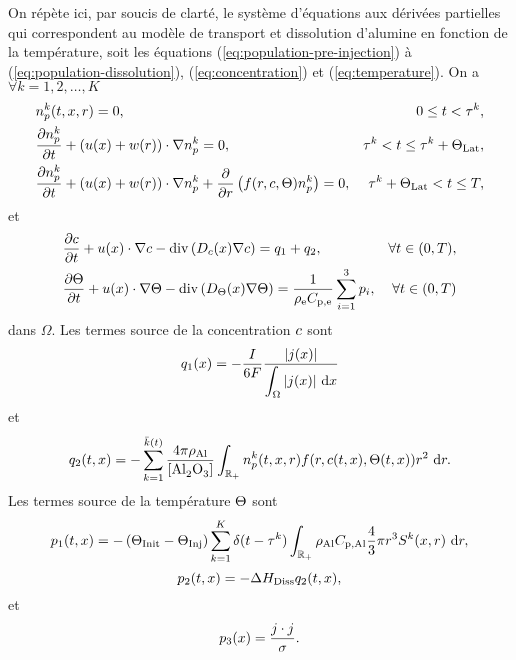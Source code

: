 On répète ici, par soucis de clarté, le système d'équations aux
dérivées partielles qui correspondent au modèle de transport et
dissolution d'alumine en fonction de la température, soit les
équations (\ref{eq:population-pre-injection}) à
(\ref{eq:population-dissolution}), (\ref{eq:concentration}) et
(\ref{eq:temperature}). On a $\forall k = 1, 2, \dots, K$
\begin{align}
  & n_p^k(t, x, r) = 0,
  & 0\leq t < \tau^k,\label{eq:mdl-eq-1}\\
%
  & \frac{\partial n_p^k}{\partial t} + \parent{u(x) + w(r)}\cdot \nabla  n_p^k = 0,
  & \tau^k < t \leq \tau^k + \tlat,\label{eq:mdl-eq-2}\\
%
  & \frac{\partial n_p^k}{\partial t} + \parent{u(x) + w(r)}\cdot \nabla  n_p^k + \frac{\partial }{\partial r}\parent{f(r, \concentration, \temperature)n_p^k} = 0,
  & \tau^k + \tlat < t \leq \tend,\label{eq:mdl-eq-3}
\end{align}
et
\begin{align}
  & \frac{\partial \concentration}{\partial t} + u(x)\cdot\nabla \concentration - \div\parent{\cdiffusivity(x) \nabla \concentration} = q_1 + q_2,
  & \forall t\in (0, T),\label{eq:mdl-eq-4}\\
%
  & \frac{\partial \temperature}{\partial t} + u(x)\cdot\nabla\temperature - \div\parent{\electrolytetdiff(x)\nabla \temperature} = \frac{1}{\electrolytedensity\electrolytehc}\sum_{i = 1}^{3}p_i,
  & \forall t\in(0, T)\label{eq:mdl-eq-5}
\end{align}
dans $\Omega$. Les termes source de la concentration $c$ sont
\begin{equation}
  q_1(x) = -\frac{I}{6\faraday} %
  \frac{\abs{j(x)}}{\displaystyle\int_\Omega\abs{j(x)}\intd{x}}
\end{equation}
et
\begin{equation}
  q_2(t, x) = -\sum_{k = 1}^{\bar
    k(t)}\frac{4\pi\aluminadensity}{[\ce{Al2O3}]}\int_{\rplus}n_p^k(t,
  x, r)f(r, \concentration(t, x), \temperature(t, x))r^2\,\intd{r}.
\end{equation}
Les termes source de la température $\Theta$ sont
\begin{equation}
  p_1(t, x) = -\left( \Theta_\text{Init}-\Theta_\text{Inj} \right)\sum_{k = 1}^{K}\delta(t -
  \tau^k)\int_{\mathbb R_+}\rho_\mathrm{Al}C_{\mathrm{p,Al}}\frac{4}{3}\pi r^3 S^k(x, r)\,\,\mathrm dr,
\end{equation}
\begin{equation}
  p_2(t, x) = - \Delta H_\text{Diss} q_2(t, x),
\end{equation}
et
\begin{equation}
  p_3(x) = \frac{j\cdot j}{\sigma}.
\end{equation}

